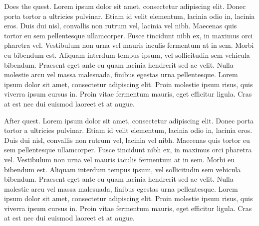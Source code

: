 Does the quest. Lorem ipsum dolor sit amet, consectetur adipiscing elit. Donec porta tortor a ultricies pulvinar. Etiam id velit elementum, lacinia odio in, lacinia eros. Duis dui nisl, convallis non rutrum vel, lacinia vel nibh. Maecenas quis tortor eu sem pellentesque ullamcorper. Fusce tincidunt nibh ex, in maximus orci pharetra vel. Vestibulum non urna vel mauris iaculis fermentum at in sem. Morbi eu bibendum est. Aliquam interdum tempus ipsum, vel sollicitudin sem vehicula bibendum. Praesent eget ante eu quam lacinia hendrerit sed ac velit. Nulla molestie arcu vel massa malesuada, finibus egestas urna pellentesque. Lorem ipsum dolor sit amet, consectetur adipiscing elit. Proin molestie ipsum risus, quis viverra ipsum cursus in. Proin vitae fermentum mauris, eget efficitur ligula. Cras at est nec dui euismod laoreet et at augue.


After quest. Lorem ipsum dolor sit amet, consectetur adipiscing elit. Donec porta tortor a ultricies pulvinar. Etiam id velit elementum, lacinia odio in, lacinia eros. Duis dui nisl, convallis non rutrum vel, lacinia vel nibh. Maecenas quis tortor eu sem pellentesque ullamcorper. Fusce tincidunt nibh ex, in maximus orci pharetra vel. Vestibulum non urna vel mauris iaculis fermentum at in sem. Morbi eu bibendum est. Aliquam interdum tempus ipsum, vel sollicitudin sem vehicula bibendum. Praesent eget ante eu quam lacinia hendrerit sed ac velit. Nulla molestie arcu vel massa malesuada, finibus egestas urna pellentesque. Lorem ipsum dolor sit amet, consectetur adipiscing elit. Proin molestie ipsum risus, quis viverra ipsum cursus in. Proin vitae fermentum mauris, eget efficitur ligula. Cras at est nec dui euismod laoreet et at augue.
